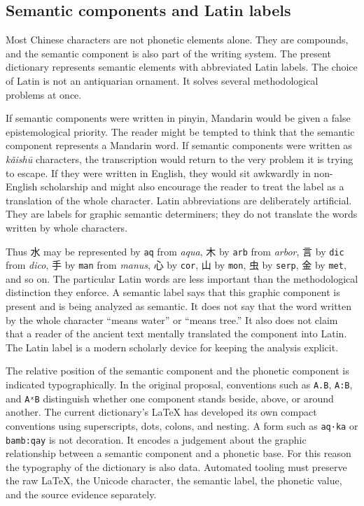 \subsection*{Semantic components and Latin labels}

Most Chinese characters are not phonetic elements alone. They are compounds, and the semantic component is also part of the writing system. The present dictionary represents semantic elements with abbreviated Latin labels. The choice of Latin is not an antiquarian ornament. It solves several methodological problems at once.

If semantic components were written in pinyin, Mandarin would be given a false epistemological priority. The reader might be tempted to think that the semantic component represents a Mandarin word. If semantic components were written as \emph{kǎishū} characters, the transcription would return to the very problem it is trying to escape. If they were written in English, they would sit awkwardly in non-English scholarship and might also encourage the reader to treat the label as a translation of the whole character. Latin abbreviations are deliberately artificial. They are labels for graphic semantic determiners; they do not translate the words written by whole characters.

Thus 水 may be represented by \texttt{aq} from \emph{aqua}, 木 by \texttt{arb} from \emph{arbor}, 言 by \texttt{dic} from \emph{dico}, 手 by \texttt{man} from \emph{manus}, 心 by \texttt{cor}, 山 by \texttt{mon}, 虫 by \texttt{serp}, 金 by \texttt{met}, and so on. The particular Latin words are less important than the methodological distinction they enforce. A semantic label says that this graphic component is present and is being analyzed as semantic. It does not say that the word written by the whole character ``means water'' or ``means tree.'' It also does not claim that a reader of the ancient text mentally translated the component into Latin. The Latin label is a modern scholarly device for keeping the analysis explicit.

The relative position of the semantic component and the phonetic component is indicated typographically. In the original proposal, conventions such as \texttt{A.B}, \texttt{A:B}, and \texttt{AˣB} distinguish whether one component stands beside, above, or around another. The current dictionary's LaTeX has developed its own compact conventions using superscripts, dots, colons, and nesting. A form such as \texttt{aq·ka} or \texttt{bamb:qay} is not decoration. It encodes a judgement about the graphic relationship between a semantic component and a phonetic base. For this reason the typography of the dictionary is also data. Automated tooling must preserve the raw LaTeX, the Unicode character, the semantic label, the phonetic value, and the source evidence separately.

